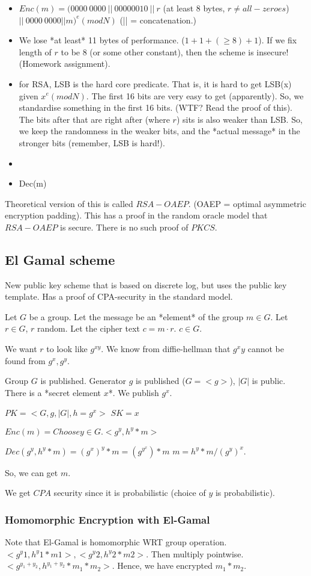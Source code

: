 \begin{itemize}
\item $Enc(m) = (0000~0000~||~0000 0010~||~r$ (at least 8 bytes, $r \neq all-zeroes$) $||~0000~0000 || m)^e (mod N)$ (|| = concatenation.)
\item We lose *at least* 11 bytes of performance. ($1 + 1 + (\geq 8) + 1$). If we fix length of $r$ to be $8$ (or some other constant),
  then the scheme is insecure! (Homework assignment).
\item for RSA, LSB is the hard core predicate. That is, it is hard to get LSB(x) given $x^e (mod N)$. The first 16 bits are very easy to get (apparently).
  So, we standardise something in the first 16 bits. (WTF? Read the proof of this). The bits after that are right after (where $r$) sits is
  also weaker than LSB. So, we keep the randomness in the weaker bits, and the *actual message* in the stronger bits (remember, LSB is hard!).
\item 
\item Dec(m)
\end{itemize}

Theoretical version of this is called $RSA-OAEP$. (OAEP = optimal asymmetric encryption padding).
This has a proof in the random oracle model that $RSA-OAEP$ is secure. There is no such proof of $PKCS$.

\subsection{El Gamal scheme}
New public key scheme that is based on discrete log, but uses the public key template.
Has a proof of CPA-security in the standard model.


Let $G$ be a group. Let the message be an *element* of the group $m \in G$.
Let $r \in G$, $r$ random. Let the cipher text $c = m \cdot r$. $c \in G$.

We want $r$ to look like $g^{xy}$. We know from diffie-hellman that $g^xy$ cannot be found from
$g^x, g^y$.

Group $G$ is published. Generator $g$ is published ($G = <g>$), $|G|$ is public.
There is a *secret element $x$*. We publish $g^x$.

$PK = <G, g, |G|, h = g^x>$
$SK = x$

$Enc(m) = Choose y \in G. <g^y, h^y * m>$

$Dec(g^y, h^y * m) = (g^x)^y * m = (g^y^x) * m$
$m = h^y * m / (g^y)^x.$

So, we can get $m$.

We get $CPA$ security since it is probabilistic (choice of $y$ is probabilistic).


\subsubsection{Homomorphic Encryption with El-Gamal}
Note that El-Gamal is homomorphic WRT group operation.
$<g^y1, h^y1 * m1>, <g^y2, h^y2 * m2>$. Then multiply pointwise. $<g^{y_1 + y_2}, h^{y_1 + y_2}*m_1*m_2>$. Hence, we have encrypted $m_1 * m_2$.




